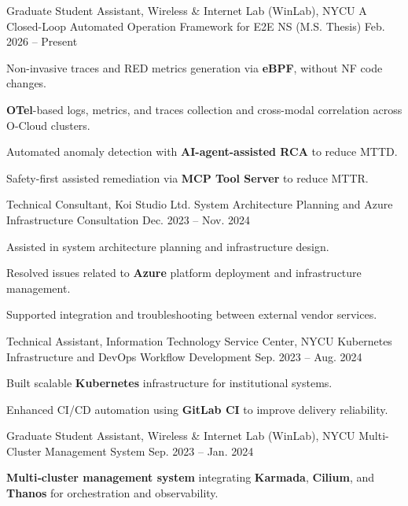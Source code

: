 \begin{cventries}
{\begin{cvitems}
    \end{cvitems}
  }
  \cventry
    {Graduate Student Assistant, Wireless \& Internet Lab (WinLab), NYCU} %
    {A Closed-Loop Automated Operation Framework for E2E NS (M.S. Thesis)} %
    {} %
    {Feb. 2026 -- Present} %
    {
      \begin{cvitems}
        \item {Non-invasive traces and RED metrics generation via \textbf{eBPF}, without NF code changes.}
        \item {\textbf{OTel}-based logs, metrics, and traces collection and cross-modal correlation across O-Cloud clusters.}
        \item {Automated anomaly detection with \textbf{AI-agent-assisted RCA} to reduce MTTD.}
        \item {Safety-first assisted remediation via \textbf{MCP Tool Server} to reduce MTTR.}
      \end{cvitems}
    }
  
  \cventry
  {Technical Consultant, Koi Studio Ltd.} %
  {System Architecture Planning and Azure Infrastructure Consultation} %
  {} %
  {Dec. 2023 -- Nov. 2024} %
  {
    \begin{cvitems}
      \item {Assisted in system architecture planning and infrastructure design.}
      \item {Resolved issues related to \textbf{Azure} platform deployment and infrastructure management.}
      \item {Supported integration and troubleshooting between external vendor services.}
    \end{cvitems}
  }

  \cventry
  {Technical Assistant, Information Technology Service Center, NYCU} %
  {Kubernetes Infrastructure and DevOps Workflow Development} %
  {} %
  {Sep. 2023 -- Aug. 2024} %
  {
    \begin{cvitems}
      \item {Built scalable \textbf{Kubernetes} infrastructure for institutional systems.}
      \item {Enhanced CI/CD automation using \textbf{GitLab CI} to improve delivery reliability.}
    \end{cvitems}
  }

  
  \cventry
  {Graduate Student Assistant, Wireless \& Internet Lab (WinLab), NYCU} %
  {Multi-Cluster Management System} %
  {} %
  {Sep. 2023 -- Jan. 2024} %
  {
    \begin{cvitems}
      \item {\textbf{Multi‑cluster management system} integrating \textbf{Karmada}, \textbf{Cilium}, and \textbf{Thanos} for orchestration and observability.}
    \end{cvitems}
  }





\end{cventries}
